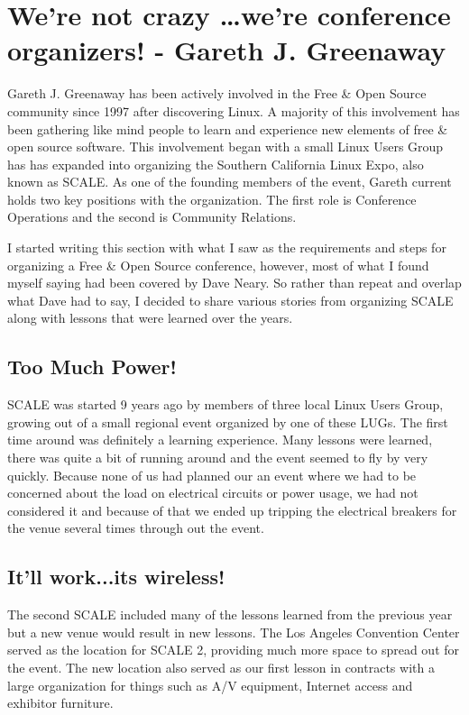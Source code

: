 \chapter{We're not crazy \dots we're conference organizers! - Gareth J.
Greenaway}

Gareth J. Greenaway has been actively involved in the Free \& Open Source
community since 1997 after discovering Linux. A majority of this involvement has
been gathering like mind people to learn and experience new elements of free \&
open source software. This involvement began with a small Linux Users Group has
has expanded into organizing the Southern California Linux Expo, also known as
SCALE. As one of the founding members of the event, Gareth current holds two key
positions with the organization. The first role is Conference Operations and the
second is Community Relations.

I started writing this section with what I saw as the requirements and steps for
organizing a Free \& Open Source conference, however, most of what I found myself
saying had been covered by Dave Neary.  So rather than repeat and overlap what
Dave had to say, I decided to share various stories from organizing SCALE along
with lessons that were learned over the years.

\section*{Too Much Power!}

SCALE was started 9 years ago by members of three local Linux Users Group,
growing out of a small regional event organized by one of these LUGs.  The first
time around was definitely a learning experience.  Many lessons were learned,
there was quite a bit of running around and the event seemed to fly by very
quickly.  Because none of us had planned our an event where we had to be
concerned about the load on electrical circuits or power usage, we had not
considered it and because of that we ended up tripping the electrical breakers
for the venue several times through out the event.

\section*{It’ll work...its wireless!}

The second SCALE included many of the lessons learned from the previous year but
a new venue would result in new lessons.  The Los Angeles Convention Center
served as the location for SCALE 2, providing much more space to spread out for
the event.  The new location also served as our first lesson in contracts with a
large organization for things such as A/V equipment, Internet access and
exhibitor furniture.  

